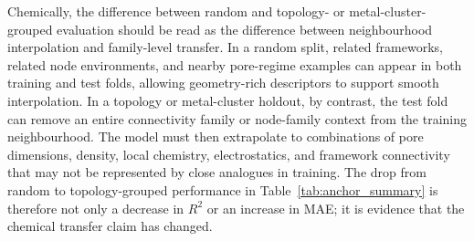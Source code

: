 \documentclass[11pt,a4paper]{article}
\begin{document}
Chemically, the difference between random and topology- or metal-cluster-grouped evaluation should be read as the difference between neighbourhood interpolation and family-level transfer. In a random split, related frameworks, related node environments, and nearby pore-regime examples can appear in both training and test folds, allowing geometry-rich descriptors to support smooth interpolation. In a topology or metal-cluster holdout, by contrast, the test fold can remove an entire connectivity family or node-family context from the training neighbourhood. The model must then extrapolate to combinations of pore dimensions, density, local chemistry, electrostatics, and framework connectivity that may not be represented by close analogues in training. The drop from random to topology-grouped performance in Table~\ref{tab:anchor_summary} is therefore not only a decrease in $R^2$ or an increase in MAE; it is evidence that the chemical transfer claim has changed.
\end{document}
